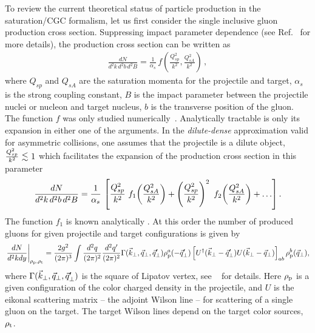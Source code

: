 To review the current theoretical  status of particle production in the saturation/CGC formalism,   
let us first consider the single inclusive gluon production cross section. 
Suppressing impact parameter dependence (see Ref.~\cite{Kovchegov:2018jun} for more details), 
the production cross section can be written as \cite{Kovchegov:1996ty,Kovchegov:1997pc} 
 \begin{align}
   \frac{dN}{d^2 k \, d^2 b \, d^2 B} 
   = \frac{1}{\alpha_s} \, f \left( 
   \frac{Q_{sp}^2}{k^2},  	 
   \frac{Q_{sA}^2}{k^2}  	 
   \right)\, ,
 \end{align}
 where $Q_{sp}$ and $Q_{sA}$ are the saturation momenta 
 for the projectile and target, $\alpha_s$ is the strong coupling constant,
 $B$ is the impact parameter between the projectile nuclei or nucleon and target nucleus, $b$ is the transverse
 position of the gluon. 
 The function $f$ was only studied numerically~\cite{Krasnitz:1999wc,Krasnitz:2003jw,Lappi:2003bi,Blaizot:2010kh}. 
 Analytically tractable is only its expansion in either one of the arguments.
 In the {\it dilute-dense} approximation valid for asymmetric collisions, one assumes 
 that the projectile is a dilute object, $  \frac{Q_{sp}^2}{k^2} \lsim
 1$ which facilitates the expansion of the production cross section in this parameter
\begin{align}
  \frac{dN}{d^2 k \, d^2 b \, d^2 B} = \frac{1}{\alpha_s} \, \left[
     \frac{Q_{sp}^2}{k^2}
	  \ f_1 \! \left(  \frac{Q_{sA}^2}{k^2} \right) +
    \left(  \frac{Q_{sp}^2}{k^2} \right)^2 \ f_2 \! \left(  \frac{Q_{sA}^2}{k^2} \right) + \ldots \right].
  \label{Eq:SIP}
\end{align}
The function $f_1$ is known analytically 
\cite{Kovchegov:1998bi,Dumitru:2001ux}. 
At this order the number of produced gluons for  given projectile and target configurations is given by 
\begin{equation}
\left.\frac{dN}{d^{2}kdy}\right|_{\rho_{\rm p},\rho_{\rm t}}=\frac{2g^{2}}{(2\pi)^{3}}\int\frac{d^{2}q}{(2\pi)^{2}}\frac{d^{2}q'}{(2\pi)^{2}}\Gamma( \vec {k}_\perp , \vec {q}_\perp , \vec {q}_\perp ')\rho_{\rm p}^{a}(- \vec {q}_\perp ')\left[U^{\dagger}( \vec {k}_\perp - \vec {q}_\perp ')U( \vec {k}_\perp - \vec {q}_\perp )\right]_{ab}\rho_{\rm p}^{b}( \vec {q}_\perp ),
\label{eq:SIPc}
\end{equation}
where $\Gamma( \vec {k}_\perp , \vec {q}_\perp , \vec {q}_\perp ')$ is the square of Lipatov vertex, 
see \myref~\cite{Kovner:2018azs} for details. 
Here $\rho_{\rm p}$ is a given configuration of the color charged density in the projectile,
and $U$ is the eikonal scattering matrix -- the adjoint Wilson line -- for scattering of
a single gluon on the target.
The target Wilson lines depend on the target color sources, $\rho_{\rm t}$. 


